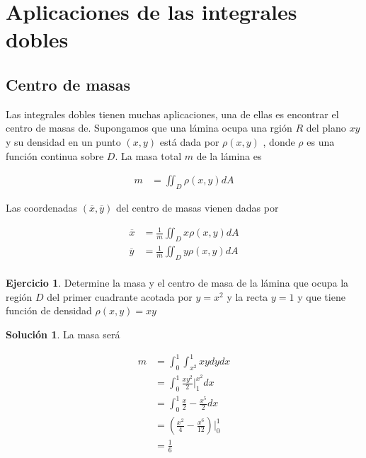 \documentclass{article}
\theoremstyle{plain}
\theoremstyle{definition}
\newtheorem{ejer}[thm]{Ejercicio}
\newtheorem{sol}[thm]{Solución}
\begin{document}
\newpage

\section{Aplicaciones de las integrales dobles}

\subsection{Centro de masas}

Las integrales dobles tienen muchas aplicaciones, una de ellas es encontrar el centro de masas de. Supongamos que una l\'amina ocupa una rgi\'on $R$ del plano $xy$ y su densidad en un punto $(x,y)$ est\'a dada por $\rho(x,y)$ , donde $\rho $ es una funci\'on continua sobre $D$. La masa total $m$ de la l\'amina es

\begin{align*}
    m &= \iint_D \rho(x,y) dA
\end{align*}

Las coordenadas $(\overline{x},\overline{y})$ del centro de masas vienen dadas por

\begin{align*}
    \overline{x} &= \frac{1}{m} \iint_D x\rho(x,y) dA \\
    \overline{y} &= \frac{1}{m} \iint_D y\rho(x,y) dA \\
\end{align*}

\begin{ejer}Determine la masa y el centro de masa  de la l\'amina que ocupa la regi\'on $D$ del primer cuadrante  acotada por $y=x^2$ y la recta $y=1$ y que tiene funci\'on de densidad $\rho(x,y) = xy$ \\
\end{ejer}

\begin{sol}La masa ser\'a
\end{sol}

\begin{align*}
    m &= \int_{0}^1\int_{x^2}^1 xy dydx \\
      &= \int_{0}^1 \frac{xy^2}{2}\bigg|_1^{x^2}dx \\
      &= \int_{0}^1 \frac{x}{2}-\frac{x^5}{2} dx \\
      &=\left(\frac{x^2}{4}-\frac{x^6}{12}\right)\bigg|_{0}^1  \\
      &= \frac{1}{6}
\end{align*}
\end{document}
